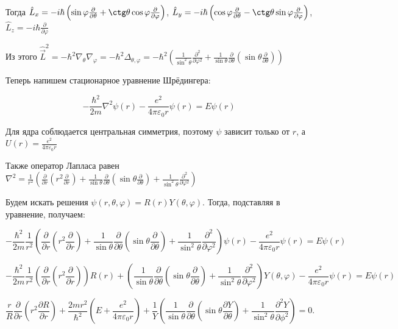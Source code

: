 \documentclass[12pt]{article}
\begin{document}
Тогда $\hat L_x = -i\hbar \left(\sin \varphi \frac{\partial}{\partial \theta} + \ctg \theta \cos \varphi \frac{\partial}{\partial \varphi}\right)$, $\hat L_y = -i\hbar \left(\cos \varphi \frac{\partial}{\partial \theta} - \ctg \theta \sin \varphi \frac{\partial}{\partial \varphi}\right)$, $\hat L_z = -i\hbar \frac{\partial}{\partial \varphi}$

Из этого $\hat {\vec L}^2 = -\hbar^2 \nabla_\theta \nabla_\varphi = -\hbar^2 \Delta_{\theta, \varphi} = -\hbar^2 \left(\frac{1}{\sin^2 \theta} \frac{\partial^2}{\partial \varphi^2} + \frac{1}{\sin \theta} \frac{\partial}{\partial \theta} \left(\sin \theta \frac{\partial}{\partial \theta}\right)\right)$

Теперь напишем стационарное уравнение Шрёдингера:

\[-\frac{\hbar^2}{2m} \nabla^2 \psi(r) - \frac{e^2}{4\pi\varepsilon_0 r} \psi(r) = E \psi(r)\]

Для ядра соблюдается центральная симметрия, поэтому $\psi$ зависит только от $r$, а $U(r) = \frac{e^2}{4\pi\varepsilon_0 r}$

Также оператор Лапласа равен $\nabla^2 = \frac{1}{r^2} \left( \frac{\partial}{\partial r} \left(r^2 \frac{\partial}{\partial r}\right) + \frac{1}{\sin \theta} \frac{\partial}{\partial \theta} \left(\sin \theta \frac{\partial}{\partial \theta}\right) + \frac{1}{\sin^2 \theta} \frac{\partial^2}{\partial \varphi^2}\right)$

Будем искать решения $\psi(r, \theta, \varphi) = R(r) Y(\theta, \varphi)$. Тогда, подставляя в уравнение, получаем:

\[-\frac{\hbar^2}{2m} \frac{1}{r^2} \left( \frac{\partial}{\partial r} \left(r^2 \frac{\partial}{\partial r}\right) + \frac{1}{\sin \theta} \frac{\partial}{\partial \theta} \left(\sin \theta \frac{\partial}{\partial \theta}\right) + \frac{1}{\sin^2 \theta} \frac{\partial^2}{\partial \varphi^2}\right) \psi(r) - \frac{e^2}{4\pi\varepsilon_0 r} \psi(r) = E \psi(r)\]

\[-\frac{\hbar^2}{2m} \frac{1}{r^2} \left( \frac{\partial}{\partial r} \left(r^2 \frac{\partial}{\partial r}\right) \right) R(r) + \left(\frac{1}{\sin \theta} \frac{\partial}{\partial \theta} \left(\sin \theta \frac{\partial}{\partial \theta}\right) + \frac{1}{\sin^2 \theta} \frac{\partial^2}{\partial \varphi^2}\right) Y(\theta, \varphi) - \frac{e^2}{4\pi\varepsilon_0 r} \psi(r) = E \psi(r)\]

\[
  \frac{r}{R}\frac{\partial }{\partial r}\left(r^2\frac{\partial R}{\partial r}\right) + \frac{2m r^2}{\hbar^2}\left( E + \dfrac{e^2}{4\pi\varepsilon_0 r} \right) + \frac{1}{Y}\left( \frac{1}{\sin\theta}\frac{\partial }{\partial \theta}\left(\sin\theta\frac{\partial Y}{\partial \theta}\right) + \frac{1}{\sin^2\theta}\frac{\partial^2 Y}{\partial \phi^2} \right) = 0.
\]
\end{document}
